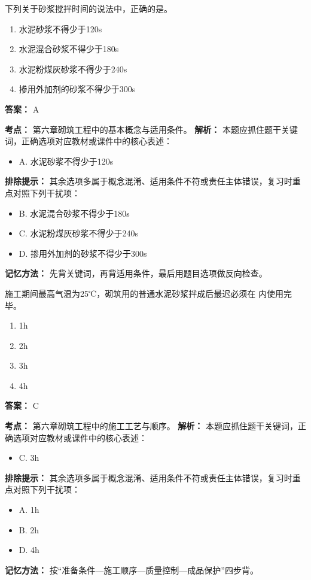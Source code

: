 \documentclass[UTF8,fontset=fandol,11pt]{ctexart}
\begin{document}
\begin{quizbox}[title={第 7 题}]
下列关于砂浆搅拌时间的说法中，正确的是。\\
\begin{enumerate}[label=\Alph*.]
\item 水泥砂浆不得少于120s
\item 水泥混合砂浆不得少于180s
\item 水泥粉煤灰砂浆不得少于240s
\item 掺用外加剂的砂浆不得少于300s
\end{enumerate}
\textbf{答案：} A
\vspace{0.25em}
\begin{answerbox}[title={考点解析}]
\textbf{考点：} 第六章砌筑工程中的基本概念与适用条件。
\textbf{解析：} 本题应抓住题干关键词，正确选项对应教材或课件中的核心表述：
\begin{itemize}
\item A. 水泥砂浆不得少于120s
\end{itemize}
\textbf{排除提示：} 其余选项多属于概念混淆、适用条件不符或责任主体错误，复习时重点对照下列干扰项：
\begin{itemize}
\item B. 水泥混合砂浆不得少于180s
\item C. 水泥粉煤灰砂浆不得少于240s
\item D. 掺用外加剂的砂浆不得少于300s
\end{itemize}
\textbf{记忆方法：} 先背关键词，再背适用条件，最后用题目选项做反向检查。
\end{answerbox}
\end{quizbox}

\vspace{0.2em}

\begin{quizbox}[title={第 8 题}]
施工期间最高气温为25℃，砌筑用的普通水泥砂浆拌成后最迟必须在 内使用完毕。\\
\begin{enumerate}[label=\Alph*.]
\item 1h
\item 2h
\item 3h
\item 4h
\end{enumerate}
\textbf{答案：} C
\vspace{0.25em}
\begin{answerbox}[title={考点解析}]
\textbf{考点：} 第六章砌筑工程中的施工工艺与顺序。
\textbf{解析：} 本题应抓住题干关键词，正确选项对应教材或课件中的核心表述：
\begin{itemize}
\item C. 3h
\end{itemize}
\textbf{排除提示：} 其余选项多属于概念混淆、适用条件不符或责任主体错误，复习时重点对照下列干扰项：
\begin{itemize}
\item A. 1h
\item B. 2h
\item D. 4h
\end{itemize}
\textbf{记忆方法：} 按“准备条件—施工顺序—质量控制—成品保护”四步背。
\end{answerbox}
\end{quizbox}
\end{document}
